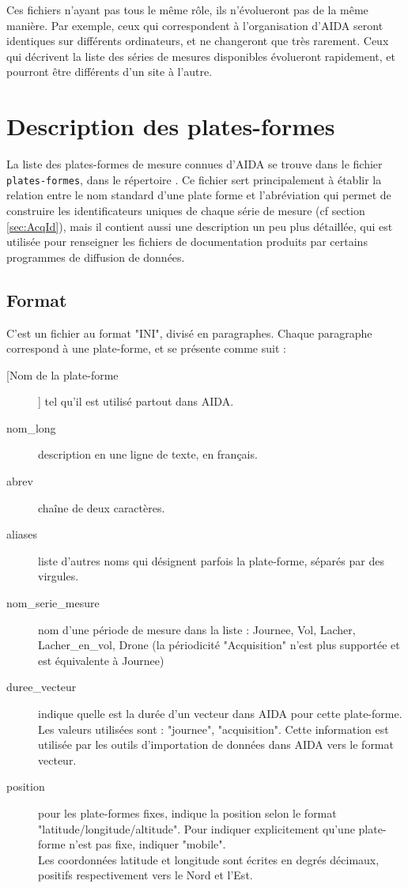 Ces fichiers n'ayant pas tous le même rôle, ils n'évolueront pas
de la même manière. Par exemple, ceux qui correspondent 
à l'organisation d'AIDA seront identiques sur
différents ordinateurs, et ne changeront que très
rarement. Ceux qui décrivent la liste des séries de
mesures disponibles évolueront rapidement, et pourront être
différents d'un site à l'autre.

\section{Description des plates-formes}
\label{sec:platef}
   La liste des plates-formes de mesure connues d'AIDA se trouve dans
le fichier \texttt{plates-formes}, dans le répertoire
. Ce
fichier sert principalement à établir la relation entre le nom standard d'une
plate forme et l'abréviation qui permet de construire les
identificateurs uniques de chaque série de mesure 
(cf section \ref{sec:AcqId}), mais il contient aussi une
description un peu plus détaillée, qui est utilisée pour
renseigner les fichiers de documentation produits par
certains programmes de diffusion de données.

\subsection{Format}
  C'est un fichier au format "INI", divisé en paragraphes. Chaque
  paragraphe correspond à une plate-forme, et se présente comme suit :
\begin{description}
  \item[[Nom de la plate-forme]] tel qu'il est utilisé partout dans AIDA.
  \item[nom\_long] description en une ligne de texte, en français.
  \item[abrev] chaîne de deux caractères.
  \item[aliases] liste d'autres noms qui désignent parfois la plate-forme,
    séparés par des virgules.
  \item[nom\_serie\_mesure] nom d'une période de mesure dans la liste :
    Journee, Vol, Lacher, Lacher\_en\_vol, Drone  (la périodicité "Acquisition"
    n'est plus supportée et est équivalente à Journee)
  \item[duree\_vecteur] indique quelle est la durée d'un vecteur dans AIDA pour
    cette plate-forme. Les valeurs utilisées sont : "journee", "acquisition".
    Cette information est utilisée par les outils d'importation de données
    dans AIDA vers le format vecteur.
  \item[position] pour les plate-formes fixes, indique la position selon le
    format "latitude/longitude/altitude". Pour indiquer explicitement qu'une
    plate-forme n'est pas fixe, indiquer "mobile".\\
    Les coordonnées latitude et longitude sont écrites en degrés décimaux,
    positifs respectivement vers le Nord et l'Est.
\end{description}

